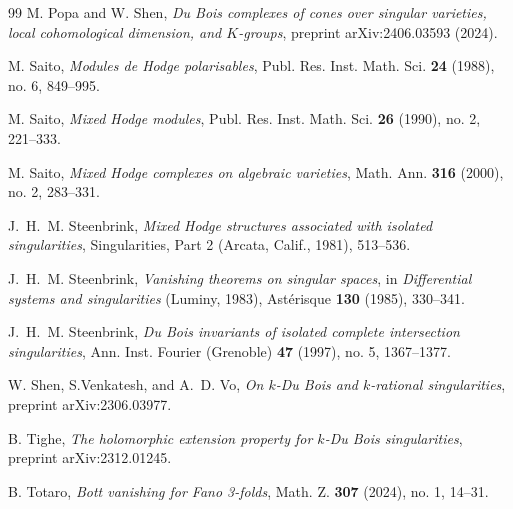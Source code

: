 \documentclass[11pt]{amsart}
\theoremstyle{definition}
\theoremstyle{plain}
\begin{document}
\begin{thebibliography}{99}
M. Popa and W. Shen, \emph{Du Bois complexes of cones over singular varieties, local cohomological dimension, and $K$-groups}, 
preprint arXiv:2406.03593  (2024).

M. Saito, \emph{Modules de {H}odge polarisables}, Publ. Res. Inst. Math. Sci. \textbf{24} (1988), no. 6, 849--995.

M. Saito, \emph{Mixed {H}odge modules}, Publ. Res. Inst. Math. Sci. \textbf{26} (1990), no. 2, 221--333.

M. Saito, \emph{Mixed {H}odge complexes on algebraic varieties},  Math. Ann. \textbf{316} (2000), no. 2, 283--331.

J.~H.~M. Steenbrink, \emph{ Mixed Hodge structures associated with isolated singularities}, 
Singularities, Part 2 (Arcata, Calif., 1981), 513–536.

J.~H.~M. Steenbrink, \emph{ Vanishing theorems on singular spaces}, in \emph{ Differential systems and singularities} (Luminy, 1983), Ast\'{e}risque \textbf{130} (1985), 330--341.

J.~H.~M. Steenbrink, \emph{ Du {B}ois invariants of isolated complete intersection singularities}, 
Ann. Inst. Fourier (Grenoble) \textbf{47} (1997), no. 5, 1367--1377.

W. Shen, S.Venkatesh, and A.~D. Vo,  \emph{ On $k$-Du Bois and $k$-rational singularities}, preprint arXiv:2306.03977.

B. Tighe, \emph{The holomorphic extension property for $k$-Du Bois singularities}, preprint arXiv:2312.01245.

B. Totaro, \emph{Bott vanishing for Fano 3-folds}, Math. Z. \textbf{307} (2024), no. 1, 14--31.


\end{thebibliography}
\end{document}
